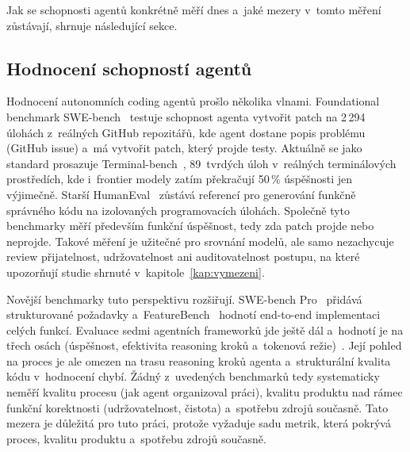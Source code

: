 Jak se schopnosti agentů konkrétně měří dnes a~jaké mezery
v~tomto měření zůstávají, shrnuje následující sekce.

\subsection{Hodnocení schopností agentů}
\label{sec:hodnoceni-ai-agentu}
\label{sec:evaluace-agentu-instrukci}
\label{sec:hodnoceni-agentu}
\label{sec:evaluace-instrukci}
\label{sec:llm-as-judge}

Hodnocení autonomních coding agentů prošlo několika vlnami.
Foundational benchmark SWE-bench~\cite{swebench2024} testuje
schopnost agenta vytvořit patch na 2\,294 úlohách z~reálných
GitHub repozitářů, kde agent dostane popis problému (GitHub issue)
a~má vytvořit patch, který projde testy. Aktuálně se jako standard
prosazuje Terminal-bench~\cite{terminalbench2026}, 89~tvrdých úloh
v~reálných terminálových prostředích, kde i~frontier modely zatím
překračují 50\,\% úspěšnosti jen výjimečně. Starší
HumanEval~\cite{chen2021humaneval} zůstává referencí pro generování
funkčně správného kódu na izolovaných programovacích úlohách.
Společně tyto benchmarky měří především funkční úspěšnost, tedy zda
patch projde nebo neprojde. Takové měření je užitečné pro srovnání
modelů, ale samo nezachycuje review přijatelnost, udržovatelnost ani
auditovatelnost postupu, na které upozorňují studie shrnuté
v~kapitole~\ref{kap:vymezeni}.

Novější benchmarky tuto perspektivu rozšiřují.
SWE-bench Pro~\cite{swebenchpro2025} přidává strukturované požadavky
a~FeatureBench~\cite{featurebench2026} hodnotí end-to-end implementaci
celých funkcí. Evaluace sedmi agentních frameworků jde ještě dál
a~hodnotí je
na třech osách (úspěšnost, efektivita reasoning kroků a~tokenová
režie)~\cite{yin2025agents}. Její pohled na proces je ale
omezen na trasu reasoning kroků agenta a~strukturální kvalita kódu
v~hodnocení chybí. Žádný z~uvedených benchmarků tedy systematicky
neměří kvalitu procesu (jak agent organizoval práci), kvalitu produktu
nad rámec funkční korektnosti (udržovatelnost, čistota)
a~spotřebu zdrojů současně. Tato mezera je důležitá pro tuto práci,
protože vyžaduje sadu metrik, která pokrývá proces, kvalitu
produktu a~spotřebu zdrojů současně.

